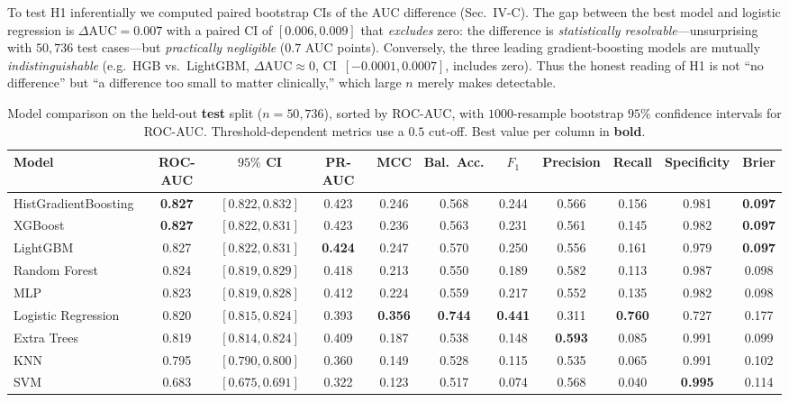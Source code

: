 \documentclass[conference]{IEEEtran}
\begin{document}
To test H1 inferentially we computed paired bootstrap CIs of the AUC difference (Sec.~IV-C).
The gap between the best model and logistic regression is
$\Delta\text{AUC}=0.007$ with a paired CI of $[0.006,0.009]$ that \emph{excludes} zero:
the difference is \emph{statistically resolvable}---unsurprising with $50{,}736$ test
cases---but \emph{practically negligible} ($0.7$ AUC points). Conversely, the three
leading gradient-boosting models are mutually \emph{indistinguishable} (e.g.\ HGB vs.\
LightGBM, $\Delta\text{AUC}\approx0$, CI~$[-0.0001,0.0007]$, includes zero). Thus the
honest reading of H1 is not ``no difference'' but ``a difference too small to matter
clinically,'' which large $n$ merely makes detectable.

\begin{table}[t]
\caption{Model comparison on the held-out \textbf{test} split ($n=50{,}736$), sorted by
ROC-AUC, with $1000$-resample bootstrap $95\%$ confidence intervals for ROC-AUC.
Threshold-dependent metrics use a $0.5$ cut-off. Best value per column in \textbf{bold}.}
\label{tab:models}
\centering
\begin{tabular}{lcccccccccc}
\toprule
Model & ROC-AUC & $95\%$ CI & PR-AUC & MCC & Bal.\ Acc. & $F_1$ & Precision & Recall & Specificity & Brier \\
\midrule
HistGradientBoosting   & \textbf{0.827} & $[0.822,0.832]$ & 0.423 & 0.246 & 0.568 & 0.244 & 0.566 & 0.156 & 0.981 & \textbf{0.097} \\
XGBoost                & \textbf{0.827} & $[0.822,0.831]$ & 0.423 & 0.236 & 0.563 & 0.231 & 0.561 & 0.145 & 0.982 & \textbf{0.097} \\
LightGBM               & 0.827 & $[0.822,0.831]$ & \textbf{0.424} & 0.247 & 0.570 & 0.250 & 0.556 & 0.161 & 0.979 & \textbf{0.097} \\
Random Forest          & 0.824 & $[0.819,0.829]$ & 0.418 & 0.213 & 0.550 & 0.189 & 0.582 & 0.113 & 0.987 & 0.098 \\
MLP                    & 0.823 & $[0.819,0.828]$ & 0.412 & 0.224 & 0.559 & 0.217 & 0.552 & 0.135 & 0.982 & 0.098 \\
Logistic Regression    & 0.820 & $[0.815,0.824]$ & 0.393 & \textbf{0.356} & \textbf{0.744} & \textbf{0.441} & 0.311 & \textbf{0.760} & 0.727 & 0.177 \\
Extra Trees            & 0.819 & $[0.814,0.824]$ & 0.409 & 0.187 & 0.538 & 0.148 & \textbf{0.593} & 0.085 & 0.991 & 0.099 \\
KNN                    & 0.795 & $[0.790,0.800]$ & 0.360 & 0.149 & 0.528 & 0.115 & 0.535 & 0.065 & 0.991 & 0.102 \\
SVM                    & 0.683 & $[0.675,0.691]$ & 0.322 & 0.123 & 0.517 & 0.074 & 0.568 & 0.040 & \textbf{0.995} & 0.114 \\
\bottomrule
\end{tabular}
\end{table}
\end{document}
